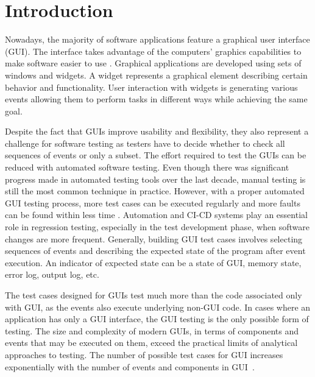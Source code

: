 
\chapter{Introduction}
Nowadays, the majority of software applications feature a graphical user interface (GUI). The interface takes advantage of the computers' graphics capabilities to make software easier to use \cite{guidefinition}. Graphical applications are developed using sets of windows and widgets. A widget represents a graphical element describing certain behavior and functionality. User interaction with widgets is generating various events allowing them to perform tasks in different ways while achieving the same goal. 

Despite the fact that GUIs improve usability and flexibility, they also represent a challenge for software testing as testers have to decide whether to check all sequences of events or only a subset. The effort required to test the GUIs can be reduced with automated software testing. Even though there was significant progress made in automated testing tools over the last decade, manual testing is still the most common technique in practice. However, with a proper automated GUI testing process, more test cases can be executed regularly and more faults can be found within less time \cite{patternbasedtesting}. Automation and CI-CD systems play an essential role in regression testing, especially in the test development phase, when software changes are more frequent. Generally, building GUI test cases involves selecting sequences of events and describing the expected state of the program after event execution. An indicator of expected state can be a state of GUI, memory state, error log, output log, etc. 

The test cases designed for GUIs test much more than the code associated only with GUI, as the events also execute underlying non-GUI code. In cases where an application has only a GUI interface, the GUI testing is the only possible form of testing. The size and complexity of modern GUIs, in terms of components and events that may be executed on them, exceed the practical limits of analytical approaches to testing. The number of possible test cases for GUI increases exponentially with the number of events and components in GUI~\cite{NguyenBao2014Gait}.


